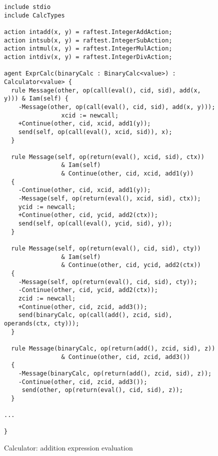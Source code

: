 \documentclass[a4paper,12pt,oneside,fleqn]{book} %
\begin{document}
\begin{figure}\footnotesize %
\begin{verbatim}
include stdio
include CalcTypes

action intadd(x, y) = raftest.IntegerAddAction;
action intsub(x, y) = raftest.IntegerSubAction;
action intmul(x, y) = raftest.IntegerMulAction;
action intdiv(x, y) = raftest.IntegerDivAction;

agent ExprCalc(binaryCalc : BinaryCalc<value>) : Calculator<value> {
  rule Message(other, op(call(eval(), cid, sid), add(x, y))) & Iam(self) {
    -Message(other, op(call(eval(), cid, sid), add(x, y)));
                xcid := newcall;
    +Continue(other, cid, xcid, add1(y));
    send(self, op(call(eval(), xcid, sid)), x);
  }

  rule Message(self, op(return(eval(), xcid, sid), ctx))
                & Iam(self)
                & Continue(other, cid, xcid, add1(y))
  {
    -Continue(other, cid, xcid, add1(y));
    -Message(self, op(return(eval(), xcid, sid), ctx));
    ycid := newcall;
    +Continue(other, cid, ycid, add2(ctx));
    send(self, op(call(eval(), ycid, sid), y));
  }

  rule Message(self, op(return(eval(), cid, sid), cty))
                & Iam(self)
                & Continue(other, cid, ycid, add2(ctx))
  {
    -Message(self, op(return(eval(), cid, sid), cty));
    -Continue(other, cid, ycid, add2(ctx));
    zcid := newcall;
    +Continue(other, cid, zcid, add3());
    send(binaryCalc, op(call(add(), zcid, sid), operands(ctx, cty)));
  }

  rule Message(binaryCalc, op(return(add(), zcid, sid), z))
                & Continue(other, cid, zcid, add3())
  {
    -Message(binaryCalc, op(return(add(), zcid, sid), z));
    -Continue(other, cid, zcid, add3());
     send(other, op(return(eval(), cid, sid), z));
  }

...

}

\end{verbatim}
\caption{Calculator: addition expression evaluation}
\label{fig:calc-rules}
\end{figure} %
\end{document}
